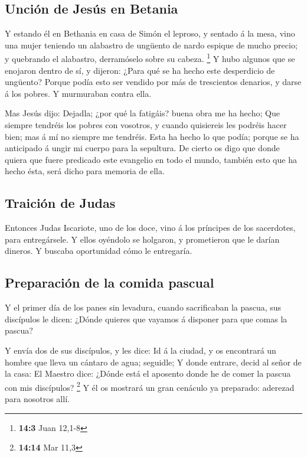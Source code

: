 \hypertarget{unciuxf3n-de-jesuxfas-en-betania}{%
\subsection{Unción de Jesús en
Betania}\label{unciuxf3n-de-jesuxfas-en-betania}}

 Y estando él en Bethania en casa de Simón el leproso, y
sentado á la mesa, vino una mujer teniendo un alabastro de ungüento de
nardo espique de mucho precio; y quebrando el alabastro, derramóselo
sobre su cabeza. \footnote{\textbf{14:3} Juan 12,1-8}  Y
hubo algunos que se enojaron dentro de sí, y dijeron: ¿Para qué se ha
hecho este desperdicio de ungüento?  Porque podía esto ser
vendido por más de trescientos denarios, y darse á los pobres. Y
murmuraban contra ella.

 Mas Jesús dijo: Dejadla; ¿por qué la fatigáis? buena obra
me ha hecho;  Que siempre tendréis los pobres con vosotros,
y cuando quisiereis les podréis hacer bien; mas á mí no siempre me
tendréis.  Esta ha hecho lo que podía; porque se ha
anticipado á ungir mi cuerpo para la sepultura.  De cierto
os digo que donde quiera que fuere predicado este evangelio en todo el
mundo, también esto que ha hecho ésta, será dicho para memoria de ella.

\hypertarget{traiciuxf3n-de-judas}{%
\subsection{Traición de Judas}\label{traiciuxf3n-de-judas}}

 Entonces Judas Iscariote, uno de los doce, vino á los
príncipes de los sacerdotes, para entregársele.  Y ellos
oyéndolo se holgaron, y prometieron que le darían dineros. Y buscaba
oportunidad cómo le entregaría.

\hypertarget{preparaciuxf3n-de-la-comida-pascual}{%
\subsection{Preparación de la comida
pascual}\label{preparaciuxf3n-de-la-comida-pascual}}

 Y el primer día de los panes sin levadura, cuando
sacrificaban la pascua, sus discípulos le dicen: ¿Dónde quieres que
vayamos á disponer para que comas la pascua?

 Y envía dos de sus discípulos, y les dice: Id á la ciudad,
y os encontrará un hombre que lleva un cántaro de agua; seguidle;
 Y donde entrare, decid al señor de la casa: El Maestro
dice: ¿Dónde está el aposento donde he de comer la pascua con mis
discípulos? \footnote{\textbf{14:14} Mar 11,3}  Y él os
mostrará un gran cenáculo ya preparado: aderezad para nosotros allí.

